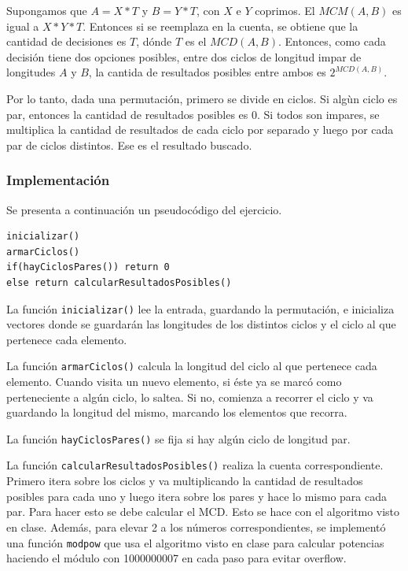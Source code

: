 Supongamos que $A=X*T$ y $B=Y*T$, con $X$ e $Y$ coprimos. El $MCM(A,B)$ es igual a $X*Y*T$. Entonces si se reemplaza en la cuenta, se obtiene que la cantidad de decisiones es $T$, dónde $T$ es el $MCD(A,B)$. Entonces, como cada decisión tiene dos opciones posibles, entre dos ciclos de longitud impar de longitudes $A$ y $B$, la cantida de resultados posibles entre ambos es $2^{MCD(A,B)}$.

Por lo tanto, dada una permutación, primero se divide en ciclos. Si algùn ciclo es par, entonces la cantidad de resultados posibles es 0. Si todos son impares, se multiplica la cantidad de resultados de cada ciclo por separado y luego por cada par de ciclos distintos. Ese es el resultado buscado.


\subsubsection{Implementación}

Se presenta a continuación un pseudocódigo del ejercicio.

\begin{verbatim}
inicializar()
armarCiclos()
if(hayCiclosPares()) return 0
else return calcularResultadosPosibles()
\end{verbatim}

La función \texttt{inicializar()} lee la entrada, guardando la permutación, e inicializa vectores donde se guardarán las longitudes de los distintos ciclos y el ciclo al que pertenece cada elemento.

La función \texttt{armarCiclos()} calcula la longitud del ciclo al que pertenece cada elemento. Cuando visita un nuevo elemento, si éste ya se marcó como perteneciente a algún ciclo, lo saltea. Si no, comienza a recorrer el ciclo y va guardando la longitud del mismo, marcando los elementos que recorra.

La función \texttt{hayCiclosPares()} se fija si hay algún ciclo de longitud par.

La función \texttt{calcularResultadosPosibles()} realiza la cuenta correspondiente. Primero itera sobre los ciclos y va multiplicando la cantidad de resultados posibles para cada uno y luego itera sobre los pares y hace lo mismo para cada par.
Para hacer esto se debe calcular el MCD. Esto se hace con el algoritmo visto en clase. Además, para elevar 2 a los números correspondientes, se implementó una función \texttt{modpow} que usa el algoritmo visto en clase para calcular potencias haciendo el módulo con 1000000007 en cada paso para evitar overflow.

